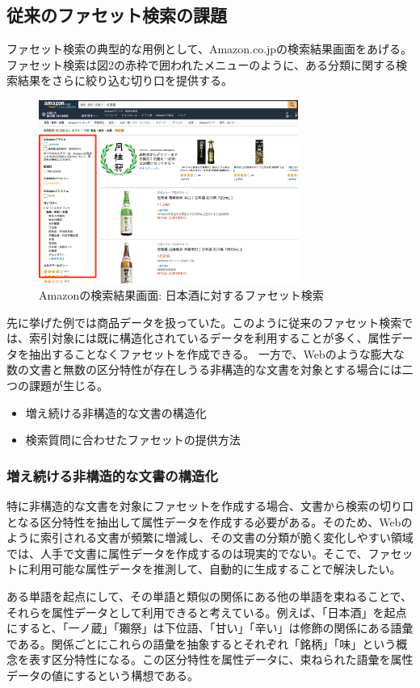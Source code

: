 \documentclass[a4j,10pt, twocolumn]{jarticle} \usepackage[dvipdfmx]{graphicx} \usepackage{amssymb} \usepackage{amsmath}
\begin{document}
\subsection{従来のファセット検索の課題}
 ファセット検索の典型的な用例として、Amazon.co.jp\cite{amazon}の検索結果画面をあげる。ファセット検索は図2の赤枠で囲われたメニューのように、ある分類に関する検索結果をさらに絞り込む切り口を提供する。
 \begin{figure}[ht]
   \includegraphics[width=85mm]{./amazon.png}
   \caption{Amazonの検索結果画面: 日本酒に対するファセット検索}
 \end{figure}
  先に挙げた例では商品データを扱っていた。このように従来のファセット検索では、索引対象には既に構造化されているデータを利用することが多く、属性データを抽出することなくファセットを作成できる。
  一方で、Webのような膨大な数の文書と無数の区分特性が存在しうる非構造的な文書を対象とする場合には二つの課題が生じる。
\begin{itemize}
  \item 増え続ける非構造的な文書の構造化
  \item 検索質問に合わせたファセットの提供方法
\end{itemize}

\subsubsection{増え続ける非構造的な文書の構造化}
 特に非構造的な文書を対象にファセットを作成する場合、文書から検索の切り口となる区分特性を抽出して属性データを作成する必要がある。そのため、Webのように索引される文書が頻繁に増減し、その文書の分類が脆く変化しやすい領域では、人手で文書に属性データを作成するのは現実的でない。そこで、ファセットに利用可能な属性データを推測して、自動的に生成することで解決したい。

 ある単語を起点にして、その単語と類似の関係にある他の単語を束ねることで、それらを属性データとして利用できると考えている。例えば、「日本酒」を起点にすると、「一ノ蔵」「獺祭」は下位語、「甘い」「辛い」は修飾の関係にある語彙である。関係ごとにこれらの語彙を抽象するとそれぞれ「銘柄」「味」という概念を表す区分特性になる。この区分特性を属性データに、束ねられた語彙を属性データの値にするという構想である。
\end{document}
